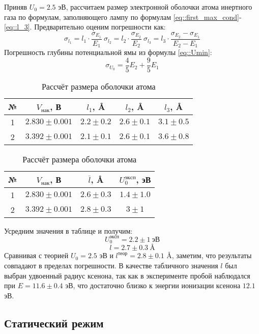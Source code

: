 Приняв $U_0 = 2.5$ эВ, рассчитаем размер электронной оболочки атома инертного
газа по формулам, заполняющего лампу по формулам
\eqref{eq::first_max_cond}-\eqref{eq::l_3}. Предварительно оценим погрешности
как:
\[
  \sigma_{l_1} = l_1 \cdot \frac{\sigma_{E_1}}{E_1} 
  \: 
  \sigma_{l_2} = l_2 \cdot \frac{\sigma_{E_2}}{E_2}
  \: 
  \sigma_{l_3} = l_3 \cdot \frac{\sigma_{E_2} - \sigma_{E_1}}{E_2 - E_1}
\]
Погрешность глубины потенциальной ямы из формулы \eqref{eq::Umin}:
\[
  \sigma_{U_0} = \frac{4}{5} E_2 + \frac{9}{5} E_1
\]
\newpage
\begin{table}[h!]
  \centering
  \caption{Рассчёт размера оболочки атома}
  \begin{tabular}{|c|c|c|c|c|}
    \hline
    № & $V_{нак}$, В & $l_1$, \AA & $l_2$, \AA & $l_3$, \AA \\ 
    \hline
    1 & $2.830 \pm 0.001$ & $2.2 \pm 0.2$ & $ 2.6 \pm 0.1$ & $3.1 \pm 0.5$ \\ \hline
    2 & $3.392 \pm 0.001$ & $2.1 \pm 0.1$ & $ 2.6 \pm 0.1$ & $ 3.6 \pm 0.8$ \\ 
    \hline
  \end{tabular}
  \begin{tabular}{|c|c|c|c|}
    \hline
    № & $V_{нак}$, В & $\overline{l}$, \AA & $U_0^{эксп}$, эВ\\
    \hline
    1 & $2.830 \pm 0.001$ & $2.6 \pm 0.3$ & $ 1.4 \pm 1.0$\\\hline
    2 & $3.392 \pm 0.001$ & $2.8 \pm 0.3$ & $ 3 \pm 1$\\
    \hline
  \end{tabular}
\end{table}
Усредним значения в таблице и получим:
\[
  U_0^{эксп} = 2.2 \pm 1 \: \text{эВ}
\]
\[
  l = 2.7 \pm 0.3 \: \text{\AA}
\]
Сравнивая с теорией $U_0 = 2.5$ эВ и $l^{теор} = 2.8 \pm 0.1$ \AA, заметим, что
результаты совпадают в пределах погрешности. В качестве табличного значения $l$
был выбран удвоенный радиус ксенона, так как в эксперименте пробой наблюдался
при $E = 11.6 \pm 0.4$ эВ, что достаточно близко к энергии ионизации ксенона
$12.1$ эВ.

\subsection{Статический режим}

